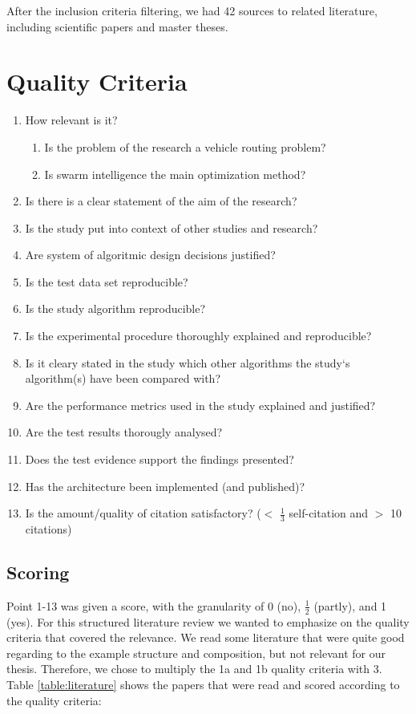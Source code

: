 After the inclusion criteria filtering, we had 42 sources to related literature, including scientific papers and master theses. 

\section{Quality Criteria} 

\begin{enumerate}
\item How relevant is it?
\begin{enumerate}
\item Is the problem of the research a vehicle routing problem?
\item Is swarm intelligence the main optimization method? 
\end{enumerate}
\item Is there is a clear statement of the aim of the research?
\item Is the study put into context of other studies and research?
\item Are system of algoritmic design decisions justified?
\item Is the test data set reproducible?
\item Is the study algorithm reproducible?
\item Is the experimental procedure thoroughly explained and reproducible?
\item Is it cleary stated in the study which other algorithms the study`s algorithm(s) have been compared with?
\item Are the performance metrics used in the study explained and justified?
\item Are the test results thorougly analysed?
\item Does the test evidence support the findings presented?
\item Has the architecture been implemented (and published)?
\item Is the amount/quality of citation satisfactory? ($<$ $\frac{1}{3}$  self-citation and $>$ 10 citations)
\end{enumerate}

\subsection{Scoring}
Point 1-13 was given a score, with the granularity of 0 (no), $\frac{1}{2}$ (partly), and 1 (yes). For this structured literature review we wanted to emphasize on the quality criteria that covered the relevance. We read some literature that were quite good regarding to the example structure and composition, but not relevant for our thesis. Therefore, we chose to multiply the 1a and 1b quality criteria with 3. Table \ref{table:literature} shows the papers that were read and scored according to the quality criteria: 

